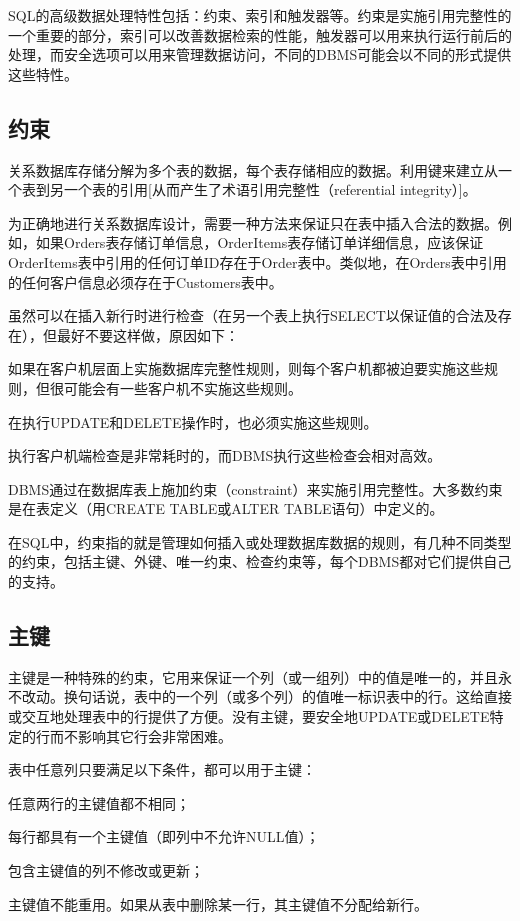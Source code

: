 SQL的高级数据处理特性包括：约束、索引和触发器等。约束是实施引用完整性的一个重要的部分，索引可以改善数据检索的性能，触发器可以用来执行运行前后的处理，而安全选项可以用来管理数据访问，不同的DBMS可能会以不同的形式提供这些特性。


\subsection{约束}


关系数据库存储分解为多个表的数据，每个表存储相应的数据。利用键来建立从一个表到另一个表的引用[从而产生了术语引用完整性（referential integrity）]。

为正确地进行关系数据库设计，需要一种方法来保证只在表中插入合法的数据。例如，如果Orders表存储订单信息，OrderItems表存储订单详细信息，应该保证OrderItems表中引用的任何订单ID存在于Order表中。类似地，在Orders表中引用的任何客户信息必须存在于Customers表中。

虽然可以在插入新行时进行检查（在另一个表上执行SELECT以保证值的合法及存在），但最好不要这样做，原因如下：

\begin{compactitem}
\item 如果在客户机层面上实施数据库完整性规则，则每个客户机都被迫要实施这些规则，但很可能会有一些客户机不实施这些规则。
\item 在执行UPDATE和DELETE操作时，也必须实施这些规则。
\item 执行客户机端检查是非常耗时的，而DBMS执行这些检查会相对高效。
\end{compactitem}


DBMS通过在数据库表上施加约束（constraint）来实施引用完整性。大多数约束是在表定义（用CREATE TABLE或ALTER TABLE语句）中定义的。

在SQL中，约束指的就是管理如何插入或处理数据库数据的规则，有几种不同类型的约束，包括主键、外键、唯一约束、检查约束等，每个DBMS都对它们提供自己的支持。


\subsection{主键}


主键是一种特殊的约束，它用来保证一个列（或一组列）中的值是唯一的，并且永不改动。换句话说，表中的一个列（或多个列）的值唯一标识表中的行。这给直接或交互地处理表中的行提供了方便。没有主键，要安全地UPDATE或DELETE特定的行而不影响其它行会非常困难。

表中任意列只要满足以下条件，都可以用于主键：

\begin{compactitem}
\item 任意两行的主键值都不相同；
\item 每行都具有一个主键值（即列中不允许NULL值）；
\item 包含主键值的列不修改或更新；
\item 主键值不能重用。如果从表中删除某一行，其主键值不分配给新行。
\end{compactitem}

